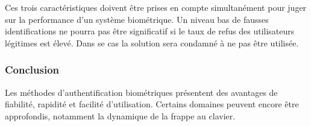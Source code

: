 Ces trois caractéristiques doivent être prises en compte simultanément pour juger sur la performance d'un système biométrique. Un niveau bas de fausses identifications ne pourra pas être significatif si le taux de refus des utilisateurs légitimes est élevé. Dans se cas la solution sera condamné à ne pas être utilisée.

\subsubsection{Conclusion}

Les méthodes d'authentification biométriques présentent des avantages de fiabilité, rapidité et facilité d'utilisation. Certains domaines peuvent encore être approfondis, notamment la dynamique de la frappe au clavier.




